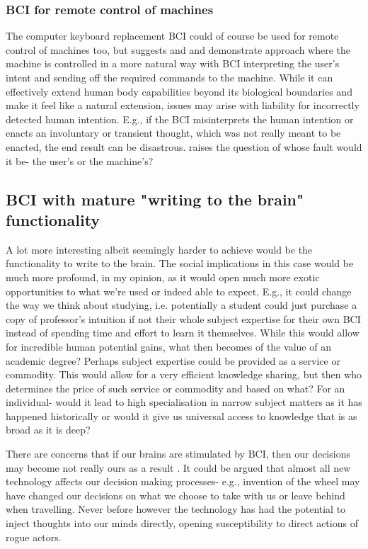 \documentclass[fleqn,11pt]{olplainarticle}
\begin{document}
\subsubsection{BCI for remote control of machines}
The computer keyboard replacement BCI could of course be used for remote control of machines too, but \cite{schalk2008brain} suggests and \cite{warwick2003cyborg} and \cite{wakefield_2020} demonstrate approach where the machine is controlled in a more natural way with BCI interpreting the user's intent and sending off the required commands to the machine. While it can effectively extend human body capabilities beyond its biological boundaries and make it feel like a natural extension, issues may arise with liability for incorrectly detected human intention. E.g., if the BCI misinterprets the human intention or enacts an involuntary or transient thought, which was not really meant to be enacted, the end result can be disastrous. \cite{schalk2008brain} raises the question of whose fault would it be- the user's or the machine's? 

\subsection{BCI with mature "writing to the brain" functionality}
A lot more interesting albeit seemingly harder to achieve would be the functionality to write to the brain. The social implications in this case would be much more profound, in my opinion, as it would open much more exotic opportunities to what we're used or indeed able to expect. E.g., it could change the way we think about studying, i.e. potentially a student could just purchase a copy of professor's intuition if not their whole subject expertise for their own BCI instead of spending time and effort to learn it themselves. While this would allow for incredible human potential gains, what then becomes of the value of an academic degree? Perhaps subject expertise could be provided as a service or commodity. This would allow for a very efficient knowledge sharing, but then who determines the price of such service or commodity and based on what? For an individual- would it lead to high specialisation in narrow subject matters as it has happened historically or would it give us universal access to knowledge that is as broad as it is deep? 

There are concerns that if our brains are stimulated by BCI, then our decisions may become not really ours as a result \cite{kogel2019using}. It could be argued that almost all new technology affects our decision making processes- e.g., invention of the wheel may have changed our decisions on what we choose to take with us or leave behind when travelling. Never before however the technology has had the potential to inject thoughts into our minds directly, opening susceptibility to direct actions of rogue actors.
\end{document}

